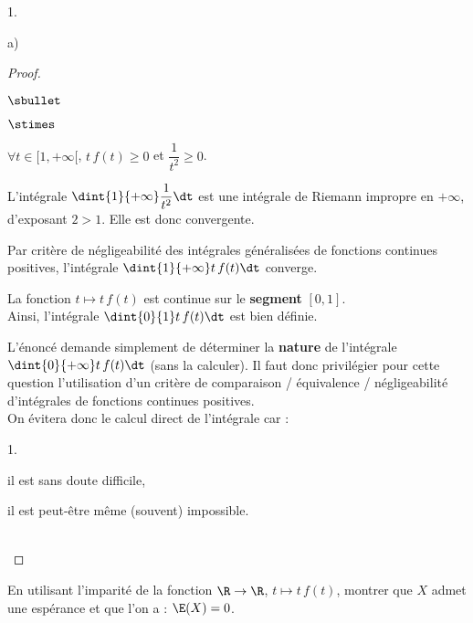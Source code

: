 \documentclass[11pt]{article}%
\begin{document}
\begin{noliste}{1.}
\begin{noliste}{a)}
\begin{proof}
\begin{noliste}{$\sbullet$}
\begin{noliste}{$\stimes$}
  \item $\forall t\in[1,+\infty[$, $t\, f(t) \geq 0$ \quad et \quad
    $\dfrac{1}{t^2}\geq 0$.
  \item L'intégrale $\dint{1}{+\infty} \dfrac{1}{t^2}\dt$ est une
    intégrale de Riemann impropre en $+\infty$, d'exposant $2>1$.
    Elle est donc convergente.
  \end{noliste}
  Par critère de négligeabilité des intégrales généralisées de 
  fonctions continues positives, l'intégrale $\dint{1}{+\infty} t\, 
  f(t)\dt$ converge.
  

  
  \newpage
  
  
\item La fonction $t\mapsto t\, f(t)$ est continue sur le {\bf
    segment} $[0,1]$.\\
  Ainsi, l'intégrale $\dint{0}{1} t\, f(t)\dt$ est bien définie.
 \end{noliste}
 
 \begin{remark}%
  L'énoncé demande simplement de déterminer la {\bf nature} de 
  l'intégrale $\dint{0}{+\infty} t\, f(t)\dt$ (sans la calculer). Il 
  faut donc privilégier pour cette question l'utilisation d'un critère 
  de comparaison / équivalence / négligeabilité d'intégrales de 
  fonctions continues positives.\\
  On évitera donc le calcul direct de l'intégrale car :
  \begin{noliste}{\scriptsize 1.}
   \item il est sans doute difficile,
   \item il est peut-être même (souvent) impossible.
  \end{noliste}
 \end{remark}~\\[-1.4cm]
\end{proof}

\item En utilisant l'imparité de la fonction $\R\to \R$, $t\mapsto t
  \, f(t)$, montrer que $X$ admet une espérance et que l'on a :
  $\E(X)=0$.


\end{noliste}
\end{noliste}
\end{document}

